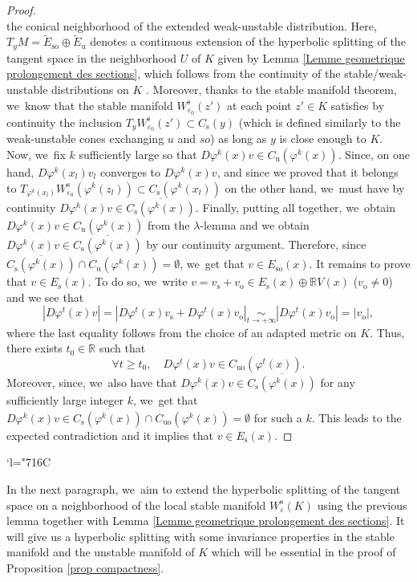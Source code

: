 \documentclass[11pt]{article}
\newcommand{\Changelback}{\mathcode`l="716C}
\newcommand{\ro}{\mathrm{o}}
\newcommand{\rs}{\mathrm{s}}
\newcommand{\rso}{\mathrm{so}}
\newcommand{\ru}{\mathrm{u}}
\newcommand{\ruo}{\mathrm{uo}}
\theoremstyle{definition}
\theoremstyle{plain}
\newcommand{\R}{\mathbb{R}}
\begin{document}
\begin{proof}
\[\]
the conical neighborhood of the extended weak-unstable distribution. Here, $T_y M = \widetilde{E}_{\rso} \oplus \widetilde{E}_{\ru}$ denotes a continuous extension of the hyperbolic splitting of the tangent space in the neighborhood $U$ of $K$ given by Lemma \ref{Lemme geometrique prolongement des sections}, which follows from the continuity of the stable/weak-unstable distributions on $K$ \cite[Prop.\,5.1.4]{FH}. Moreover, thanks to the stable manifold theorem, we~know that the stable manifold $W_{\varepsilon_0}^\rs (z')$ at each point \hbox{$z' \in K$} satisfies by continuity the inclusion $ T_y W_{\varepsilon_0}^{\rs} (z') \subset C_{\rs} (y)$ (which is defined similarly to the weak-unstable cones exchanging $u$ and $so$) as long as $y$ is close enough to $K$. Now, we~fix $k$ sufficiently large so that $D \varphi^k (x)v \in C_{\ru} (\varphi^k (x))$. Since, on one hand, $D \varphi^k (x_l)v_l$ converges to $D \varphi^k (x)v$, and since we proved that it belongs to $ T_{\varphi^k (x_l)} W_{\varepsilon_0}^{\rs} (\varphi^k (z_l)) \subset C_{\rs} (\varphi^k (x_l))$ on the other hand, we~must have by continuity $ D \varphi^k (x)v \in \overline{C_{\rs} (\varphi^k (x))}.$
Finally, putting all together, we~obtain $D \varphi^k (x)v \in C_{\ru} (\varphi^k (x))$ from the $\lambda$-lemma and we obtain $ D \varphi^k (x)v \in \overline{C_{\rs} (\varphi^k (x))}$ by our continuity argument. Therefore, since $\overline{C_{\rs} (\varphi^k (x))} \cap C_{\ru} (\varphi^k (x)) = \emptyset$, we~get that $v \in E_{\rso} (x)$. It remains to prove that $v \in E_\rs (x)$. To do so, we~write $v = v_\rs + v_\ro \in E_\rs (x) \oplus \R V(x)$ ($v_\ro \neq 0$) and we see that
\[
|D\varphi^t (x) v| = |D\varphi^t (x) v_\rs + D\varphi^t (x) v_\ro| \underset{t \to +\infty}{\sim} |D\varphi^t (x) v_\ro | = |v_\ro|,
\]
where the last equality follows from the choice of an adapted metric on $K$. Thus, there exists $t_0 \in \R$ such that
\[
\forall t \geq t_0, \quad D\varphi^t (x) v \in C_{\ruo}(\varphi^t (x)).
\]
Moreover, since, we~also have that $ D \varphi^k (x)v \in \overline{C_{\rs} (\varphi^k (x))}$ for any sufficiently large integer $k$, we~get that $D \varphi^k (x)v \in \overline{C_{\rs} (\varphi^k (x))} \cap C_{\ruo}(\varphi^k (x)) = \emptyset$ for such a $k$. This leads to the expected contradiction and it implies that $v \in E_\rs (x)$.
\end{proof}
\Changelback%

In the next paragraph, we~aim to extend the hyperbolic splitting of the tangent space on a neighborhood of the local stable manifold $W_{\varepsilon}^\rs (K)$ using the previous lemma together with Lemma \ref{Lemme geometrique prolongement des sections}. It will give us a hyperbolic splitting with some invariance properties in the stable manifold and the unstable manifold of $K$ which will be essential in the proof of Proposition \ref{prop compactness}.
\end{document}
